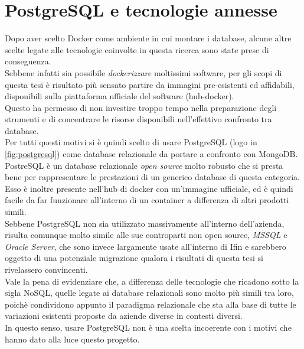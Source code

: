 \section{PostgreSQL e tecnologie annesse}
Dopo aver scelto Docker come ambiente in cui montare i database, alcune altre scelte legate alle tecnologie coinvolte in questa ricerca sono state prese di conseguenza.\\
Sebbene infatti sia possibile \textit{dockerizzare} moltissimi software, per gli scopi di questa tesi è risultato più sensato partire da immagini pre-esistenti ed affidabili, disponibili sulla piattaforma ufficiale del software (hub-docker).\\
Questo ha permesso di non investire troppo tempo nella preparazione degli strumenti e di concentrare le risorse disponibili nell'effettivo confronto tra database.\\

\noindent Per tutti questi motivi si è quindi scelto di usare PostgreSQL (logo in \autoref{fig:postgresql}) come database relazionale da portare a confronto con MongoDB.\\
PostreSQL è un database relazionale \textit{open source} molto robusto che si presta bene per rappresentare le prestazioni di un generico database di questa categoria\cite{site:postgres}. Esso è inoltre presente nell'hub di docker con un'immagine ufficiale, ed è quindi facile da far funzionare all'interno di un container a differenza di altri prodotti simili.\\
Sebbene PostgreSQL non sia utilizzato massivamente all'interno dell'azienda, risulta comunque molto simile alle sue controparti non open source, \textit{MSSQL} e \textit{Oracle Server}, che sono invece largamente usate all'interno di Ifin e sarebbero oggetto di una potenziale migrazione qualora i risultati di questa tesi si rivelassero convincenti.\\

\noindent Vale la pena di evidenziare che, a differenza delle tecnologie che ricadono sotto la sigla NoSQL, quelle legate ai database relazionali sono molto più simili tra loro, poichè condividono appunto il paradigma relazionale che sta alla base di tutte le variazioni esistenti proposte da aziende diverse in contesti diversi.\\
In questo senso, usare PostgreSQL non è una scelta incoerente con i motivi che hanno dato alla luce questo progetto.\\

